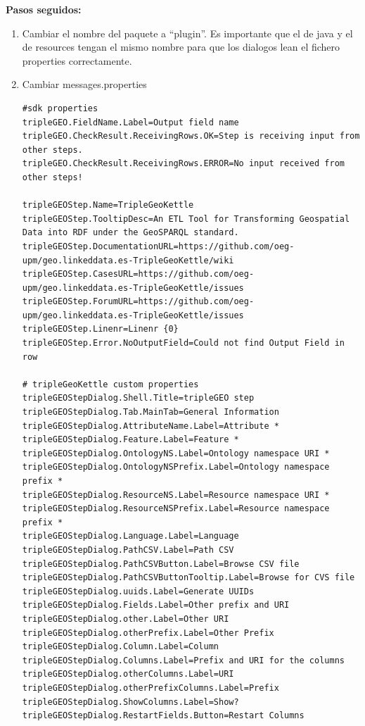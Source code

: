 \textbf{Pasos seguidos:}

\begin{enumerate}
    \item Cambiar el nombre del paquete a ``plugin''. Es importante que el de java y el de resources tengan el
        mismo nombre para que los dialogos lean el fichero properties correctamente.

    \item Cambiar messages.properties
\begin{lstlisting}
#sdk properties
tripleGEO.FieldName.Label=Output field name
tripleGEO.CheckResult.ReceivingRows.OK=Step is receiving input from other steps.
tripleGEO.CheckResult.ReceivingRows.ERROR=No input received from other steps!

tripleGEOStep.Name=TripleGeoKettle
tripleGEOStep.TooltipDesc=An ETL Tool for Transforming Geospatial Data into RDF under the GeoSPARQL standard.
tripleGEOStep.DocumentationURL=https://github.com/oeg-upm/geo.linkeddata.es-TripleGeoKettle/wiki
tripleGEOStep.CasesURL=https://github.com/oeg-upm/geo.linkeddata.es-TripleGeoKettle/issues
tripleGEOStep.ForumURL=https://github.com/oeg-upm/geo.linkeddata.es-TripleGeoKettle/issues
tripleGEOStep.Linenr=Linenr {0}
tripleGEOStep.Error.NoOutputField=Could not find Output Field in row

# tripleGeoKettle custom properties
tripleGEOStepDialog.Shell.Title=tripleGEO step
tripleGEOStepDialog.Tab.MainTab=General Information
tripleGEOStepDialog.AttributeName.Label=Attribute *
tripleGEOStepDialog.Feature.Label=Feature *
tripleGEOStepDialog.OntologyNS.Label=Ontology namespace URI *
tripleGEOStepDialog.OntologyNSPrefix.Label=Ontology namespace prefix *
tripleGEOStepDialog.ResourceNS.Label=Resource namespace URI *
tripleGEOStepDialog.ResourceNSPrefix.Label=Resource namespace prefix *
tripleGEOStepDialog.Language.Label=Language
tripleGEOStepDialog.PathCSV.Label=Path CSV
tripleGEOStepDialog.PathCSVButton.Label=Browse CSV file
tripleGEOStepDialog.PathCSVButtonTooltip.Label=Browse for CVS file
tripleGEOStepDialog.uuids.Label=Generate UUIDs
tripleGEOStepDialog.Fields.Label=Other prefix and URI
tripleGEOStepDialog.other.Label=Other URI
tripleGEOStepDialog.otherPrefix.Label=Other Prefix
tripleGEOStepDialog.Column.Label=Column
tripleGEOStepDialog.Columns.Label=Prefix and URI for the columns
tripleGEOStepDialog.otherColumns.Label=URI
tripleGEOStepDialog.otherPrefixColumns.Label=Prefix
tripleGEOStepDialog.ShowColumns.Label=Show?
tripleGEOStepDialog.RestartFields.Button=Restart Columns
\end{lstlisting}


\end{enumerate}
